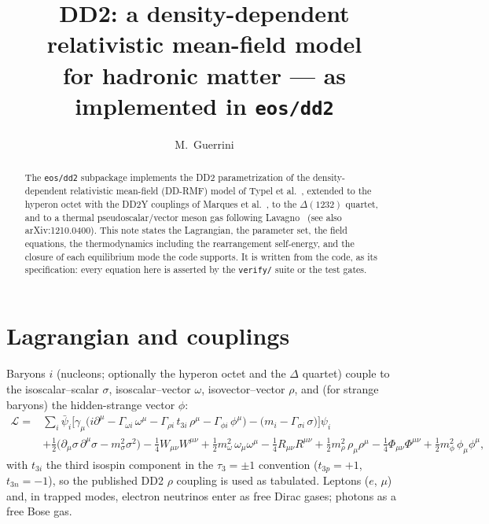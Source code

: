 \documentclass[aps,prc,onecolumn,superscriptaddress,nofootinbib,10pt]{revtex4-2}
\begin{document}
\title{DD2: a density-dependent relativistic mean-field model \\
       for hadronic matter --- as implemented in \texttt{eos/dd2}}

\author{M.~Guerrini}

\begin{abstract}
The \texttt{eos/dd2} subpackage implements the DD2 parametrization of the
density-dependent relativistic mean-field (DD-RMF) model of Typel et
al.~\cite{Typel2010}, extended to the hyperon octet with the DD2Y couplings of
Marques et al.~\cite{Marques2017,Fortin2017}, to the $\Delta(1232)$ quartet,
and to a thermal pseudoscalar/vector meson gas following
Lavagno~\cite{Lavagno2010} (see also arXiv:1210.0400). This note states the
Lagrangian, the parameter set, the field equations, the thermodynamics
including the rearrangement self-energy, and the closure of each equilibrium
mode the code supports. It is written from the code, as its specification:
every equation here is asserted by the \texttt{verify/} suite or the test
gates.
\end{abstract}

\maketitle

\section{Lagrangian and couplings}

Baryons $i$ (nucleons; optionally the hyperon octet and the $\Delta$ quartet)
couple to the isoscalar--scalar $\sigma$, isoscalar--vector $\omega$,
isovector--vector $\rho$, and (for strange baryons) the hidden-strange vector
$\phi$:
%
\begin{align}
\mathcal{L} ={}& \sum_i \bar\psi_i \Big[ \gamma_\mu \big( i\partial^\mu
      - \Gamma_{\omega i}\,\omega^\mu
      - \Gamma_{\rho i}\, t_{3i}\, \rho^\mu
      - \Gamma_{\phi i}\, \phi^\mu \big)
      - \big( m_i - \Gamma_{\sigma i}\,\sigma \big) \Big] \psi_i
      \nonumber\\
 &+ \tfrac12 \big( \partial_\mu \sigma\, \partial^\mu \sigma
      - m_\sigma^2 \sigma^2 \big)
   - \tfrac14 W_{\mu\nu} W^{\mu\nu} + \tfrac12 m_\omega^2\, \omega_\mu \omega^\mu
   - \tfrac14 R_{\mu\nu} R^{\mu\nu} + \tfrac12 m_\rho^2\, \rho_\mu \rho^\mu
   - \tfrac14 \Phi_{\mu\nu} \Phi^{\mu\nu} + \tfrac12 m_\phi^2\, \phi_\mu \phi^\mu ,
\label{eq:lagrangian}
\end{align}
%
with $t_{3i}$ the third isospin component in the $\tau_3 = \pm 1$ convention
($t_{3p} = +1$, $t_{3n} = -1$), so the published DD2 $\rho$ coupling is used
as tabulated. Leptons ($e$, $\mu$) and, in trapped modes, electron neutrinos
enter as free Dirac gases; photons as a free Bose gas.
\end{document}
